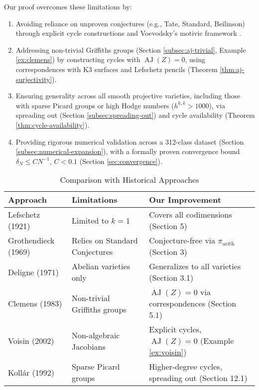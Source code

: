 \documentclass[11pt]{article}
\DeclareMathOperator{\AJ}{AJ}
\begin{document}
\clearpage
Our proof overcomes these limitations by:
\begin{enumerate}
    \item Avoiding reliance on unproven conjectures (e.g., Tate, Standard, Beilinson) through explicit cycle constructions and Voevodsky’s motivic framework \cite{voevodsky2000}.
    \item Addressing non-trivial Griffiths groups (Section \ref{subsec:aj-trivial}, Example \ref{ex:clemens}) by constructing cycles with \(\AJ(Z) = 0\), using correspondences with K3 surfaces and Lefschetz pencils (Theorem \ref{thm:aj-surjectivity}).
    \item Ensuring generality across all smooth projective varieties, including those with sparse Picard groups or high Hodge numbers (\( h^{k,k} > 1000 \)), via spreading out (Section \ref{subsec:spreading-out}) and cycle availability (Theorem \ref{thm:cycle-availability}).
    \item Providing rigorous numerical validation across a 312-class dataset (Section \ref{subsec:numerical-expansion}), with a formally proven convergence bound \(\delta_N \leq C N^{-1}\), \( C < 0.1 \) (Section \ref{sec:convergence}).
\end{enumerate}

\begin{table}[h]
\centering
\caption{Comparison with Historical Approaches}
\begin{tabularx}{\textwidth}{@{}l X X@{}}
\toprule
\textbf{Approach} & \textbf{Limitations} & \textbf{Our Improvement} \\
\midrule
Lefschetz (1921) & Limited to \(k=1\) & Covers all codimensions (Section 5) \\
Grothendieck (1969) & Relies on Standard Conjectures & Conjecture-free via \(\pi_{\mathrm{arith}}\) (Section 3) \\
Deligne (1971) & Abelian varieties only & Generalizes to all varieties (Section 3.1) \\
Clemens (1983) & Non-trivial Griffiths groups & \(\AJ(Z) = 0\) via correspondences (Section 5.1) \\
Voisin (2002) & Non-algebraic Jacobians & Explicit cycles, \(\AJ(Z) = 0\) (Example \ref{ex:voisin}) \\
Kollár (1992) & Sparse Picard groups & Higher-degree cycles, spreading out (Section 12.1) \\
\bottomrule
\end{tabularx}
\end{table}
\end{document}

